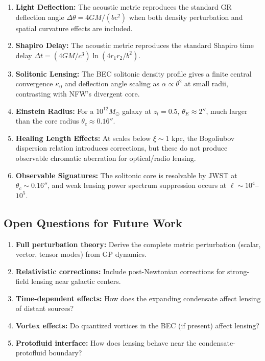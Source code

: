 \documentclass[11pt,a4paper]{article}
\theoremstyle{definition}
\theoremstyle{remark}
\begin{document}
\begin{enumerate}[leftmargin=*, itemsep=0.3em]
\item \textbf{Light Deflection:} The acoustic metric reproduces the standard GR deflection angle $\Delta\theta = 4GM/(bc^2)$ when both density perturbation and spatial curvature effects are included.

\item \textbf{Shapiro Delay:} The acoustic metric reproduces the standard Shapiro time delay $\Delta t = (4GM/c^3)\ln(4r_1r_2/b^2)$.

\item \textbf{Solitonic Lensing:} The BEC solitonic density profile gives a finite central convergence $\kappa_0$ and deflection angle scaling as $\alpha \propto \theta^2$ at small radii, contrasting with NFW's divergent core.

\item \textbf{Einstein Radius:} For a $10^{12} M_\odot$ galaxy at $z_l = 0.5$, $\theta_E \approx 2''$, much larger than the core radius $\theta_c \approx 0.16''$.

\item \textbf{Healing Length Effects:} At scales below $\xi \sim 1$ kpc, the Bogoliubov dispersion relation introduces corrections, but these do not produce observable chromatic aberration for optical/radio lensing.

\item \textbf{Observable Signatures:} The solitonic core is resolvable by JWST at $\theta_c \sim 0.16''$, and weak lensing power spectrum suppression occurs at $\ell \sim 10^4$--$10^5$.
\end{enumerate}

\subsection{Open Questions for Future Work}

\begin{enumerate}[leftmargin=*, itemsep=0.3em]
\item \textbf{Full perturbation theory:} Derive the complete metric perturbation (scalar, vector, tensor modes) from GP dynamics.

\item \textbf{Relativistic corrections:} Include post-Newtonian corrections for strong-field lensing near galactic centers.

\item \textbf{Time-dependent effects:} How does the expanding condensate affect lensing of distant sources?

\item \textbf{Vortex effects:} Do quantized vortices in the BEC (if present) affect lensing?

\item \textbf{Protofluid interface:} How does lensing behave near the condensate-protofluid boundary?
\end{enumerate}
\end{document}
